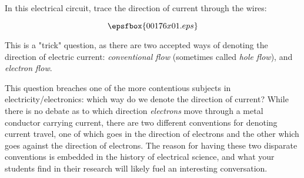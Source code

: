 

In this electrical circuit, trace the direction of current through the wires:

$$\epsfbox{00176x01.eps}$$







This is a "trick" question, as there are two accepted ways of denoting the direction of electric current: {\it conventional flow} (sometimes called {\it hole flow}), and {\it electron flow}.







This question breaches one of the more contentious subjects in electricity/electronics: which way do we denote the direction of current?  While there is no debate as to which direction {\it electrons} move through a metal conductor carrying current, there are two different conventions for denoting current travel, one of which goes in the direction of electrons and the other which goes against the direction of electrons.  The reason for having these two disparate conventions is embedded in the history of electrical science, and what your students find in their research will likely fuel an interesting conversation.




